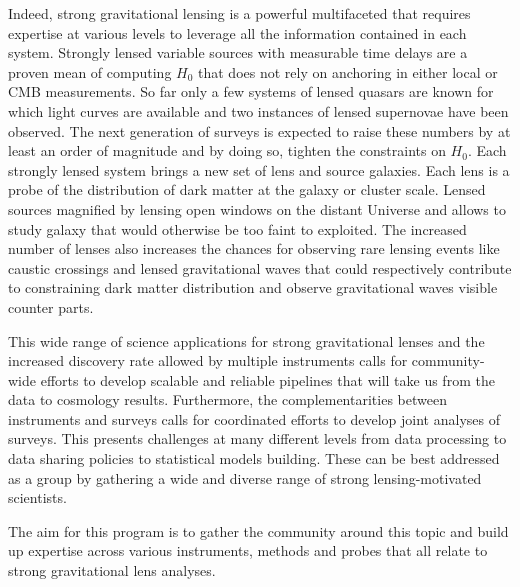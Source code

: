 \documentclass[11pt, letterpaper]{article}
\begin{document}
    Indeed, strong gravitational lensing is a powerful multifaceted that requires expertise at various levels to leverage all the information contained in each system.
    Strongly lensed variable sources with measurable time delays are a proven mean of computing $H_0$ that does not rely on anchoring in either local or CMB measurements. So far only a few systems of lensed quasars are known for which light curves are available and two instances of lensed supernovae have been observed. The next generation of surveys is expected to raise these numbers by at least an order of magnitude and by doing so, tighten the constraints on $H_0$. 
    Each strongly lensed system brings a new set of lens and source galaxies. Each lens is a probe of the distribution of dark matter at the galaxy or cluster scale. Lensed sources magnified by lensing open windows on the distant Universe and allows to study galaxy that would otherwise be too faint to exploited. 
    The increased number of lenses also increases the chances for observing rare lensing events like caustic crossings and lensed gravitational waves that could respectively contribute to constraining dark matter distribution and observe gravitational waves visible counter parts.
    
    This wide range of science applications for strong gravitational lenses and the increased discovery rate allowed by multiple instruments calls for community-wide efforts to develop scalable and reliable pipelines that will take us from the data to cosmology results. Furthermore, the complementarities between instruments and surveys calls for coordinated efforts to develop joint analyses of surveys. This presents challenges at many different levels from data processing to data sharing policies to statistical models building. These can be best addressed as a group by gathering a wide and diverse range of strong lensing-motivated scientists.
    
    The aim for this program is to gather the community around this topic and build up expertise across various instruments, methods and probes that all relate to strong gravitational lens analyses. 
    
\end{document}
